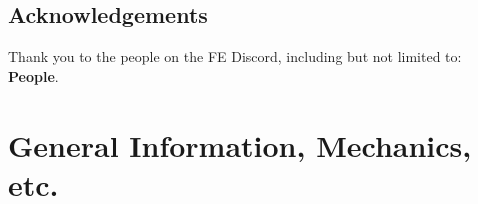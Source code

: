 \documentclass[a4paper]{report}
\begin{document}
\setlength{\columnsep}{.5cm}

\section*{Acknowledgements}

Thank you to the people on the FE Discord, including but not limited to: \textbf{People}.
\newpage
\chapter*{General Information, Mechanics, etc.}







\newpage
{}




\newpage



\end{document}
